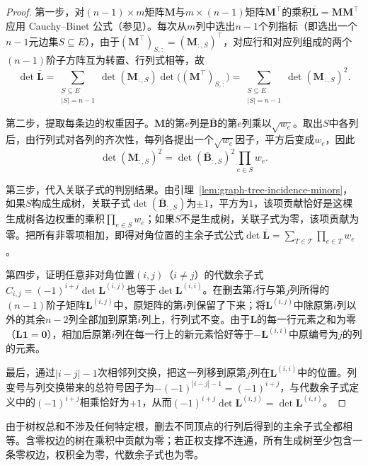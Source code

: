 \begin{proof}
第一步，对$(n-1)\times m$矩阵$\bm M$与$m\times(n-1)$矩阵$\bm M^\top$的乘积$\overline{\bm L}=\bm M\bm M^\top$应用 Cauchy--Binet 公式（参见）。每次从$m$列中选出$n-1$个列指标（即选出一个$n-1$元边集$S\subseteq E$），由于$(\bm M^\top)_{S,:}=(\bm M_{:,S})^\top$，对应行和对应列组成的两个$(n-1)$阶子方阵互为转置、行列式相等，故
\[
  \det\overline{\bm L}
  =\sum_{\substack{S\subseteq E\\ |S|=n-1}}\det(\bm M_{:,S})\det\bigl((\bm M^\top)_{S,:}\bigr)
  =\sum_{\substack{S\subseteq E\\ |S|=n-1}}\det(\bm M_{:,S})^2.
\]

第二步，提取每条边的权重因子。$\bm M$的第$e$列是$\overline{\bm B}$的第$e$列乘以$\sqrt{w_e}$。取出$S$中各列后，由行列式对各列的齐次性，每列各提出一个$\sqrt{w_e}$因子，平方后变成$w_e$，因此
\[
  \det(\bm M_{:,S})^2=\det(\overline{\bm B}_{:,S})^2\prod_{e\in S}w_e.
\]

第三步，代入关联子式的判别结果。由引理~\ref{lem:graph-tree-incidence-minors}，如果$S$构成生成树，关联子式$\det(\overline{\bm B}_{:,S})$为$\pm1$，平方为$1$，该项贡献恰好是这棵生成树各边权重的乘积$\prod_{e\in S}w_e$；如果$S$不是生成树，关联子式为零，该项贡献为零。把所有非零项相加，即得对角位置的主余子式公式$\det\overline{\bm L}=\sum_{T\in\mathcal T}\prod_{e\in T}w_e$。

第四步，证明任意非对角位置$(i,j)$（$i\neq j$）的代数余子式$C_{i,j}=(-1)^{i+j}\det\bm L^{(i,j)}$也等于$\det\bm L^{(i,i)}$。在删去第$i$行与第$j$列所得的$(n-1)$阶子矩阵$\bm L^{(i,j)}$中，原矩阵的第$i$列保留了下来；将$\bm L^{(i,j)}$中除原第$i$列以外的其余$n-2$列全部加到原第$i$列上，行列式不变。由于$\bm L$的每一行元素之和为零（$\bm L\bm 1=\bm 0$），相加后原第$i$列在每一行上的新元素恰好等于$-\bm L^{(i,i)}$中原编号为$j$的列的元素。

最后，通过$|i-j|-1$次相邻列交换，把这一列移到原第$j$列在$\bm L^{(i,i)}$中的位置。列变号与列交换带来的总符号因子为$-(-1)^{|i-j|-1}=(-1)^{i+j}$，与代数余子式定义中的$(-1)^{i+j}$相乘恰好为$+1$，从而$(-1)^{i+j}\det\bm L^{(i,j)}=\det\bm L^{(i,i)}$。
\end{proof}

由于树权总和不涉及任何特定根，删去不同顶点的行列后得到的主余子式全都相等。含零权边的树在乘积中贡献为零；若正权支撑不连通，所有生成树至少包含一条零权边，权积全为零，代数余子式也为零。

